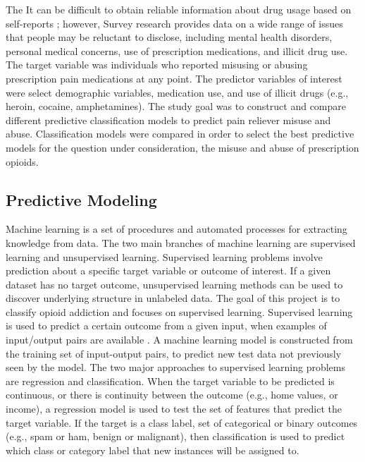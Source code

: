 \documentclass[sigconf]{acmart}
\begin{document}
 The It can be difficult to obtain reliable 
information about drug usage based on self-reports   \cite{varshney13};
however, Survey research provides data on a wide range of issues that people 
may be reluctant to disclose, including mental health disorders, personal 
medical concerns, use of prescription medications, and illicit drug use. 
The target variable was individuals who reported misusing or abusing 
prescription pain medications at any point. The predictor variables of 
interest were select demographic variables, medication use, and use of 
illicit drugs (e.g., heroin, cocaine, amphetamines). The study goal was to 
construct and compare different predictive classification models to predict 
pain reliever misuse and abuse. Classification models were compared in order 
to select the best predictive models for the question under consideration,
the misuse and abuse of prescription opioids. 

\subsection{Predictive Modeling}

Machine learning is a set of procedures and automated processes for extracting 
knowledge from data. The two main branches of machine learning are supervised 
learning and unsupervised learning. Supervised learning problems involve 
prediction about a specific target variable or outcome of interest. If a given 
dataset has no target outcome, unsupervised learning methods can be used to 
discover underlying structure in unlabeled data. The goal of this project is 
to classify opioid addiction and focuses on supervised learning. Supervised 
learning is used to predict a certain outcome from a given input, when examples 
of input/output pairs are available \cite{muller17}. A machine learning model 
is constructed from the training set of input-output pairs, to predict new test 
data not previously seen by the model. The two major approaches to supervised 
learning problems are regression and classification. When the target variable 
to be predicted is continuous, or there is continuity between the outcome 
(e.g., home values, or income), a regression model is used to test the set of 
features that predict the target variable. If the target is a class label, set 
of categorical or binary outcomes (e.g., spam or ham, benign or malignant), 
then classification is used to predict which class or category 
label that new instances will be assigned to.
\end{document}
